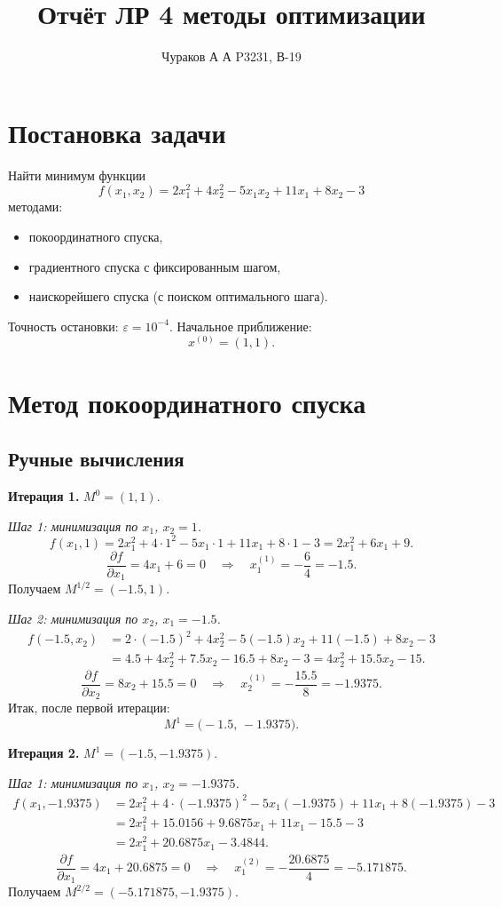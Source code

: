 \documentclass{article}
\begin{document}
\title{Отчёт ЛР 4 методы оптимизации}
\author{Чураков А А P3231, В-19}
\maketitle

\section{Постановка задачи}
Найти минимум функции
\[
f(x_1,x_2)=2x_1^2+4x_2^2-5x_1x_2+11x_1+8x_2-3
\]
методами:
\begin{itemize}
  \item покоординатного спуска,
  \item градиентного спуска с фиксированным шагом,
  \item наискорейшего спуска (с поиском оптимального шага).
\end{itemize}
Точность остановки: $\varepsilon=10^{-4}$. Начальное приближение:
\[
x^{(0)}=(1,1).
\]

\section{Метод покоординатного спуска}
\subsection{Ручные вычисления}

\textbf{Итерация 1.} $M^0=(1,1)$.

\medskip
\emph{Шаг 1: минимизация по $x_1$, $x_2=1$.}
\[
f(x_1,1)=2x_1^2+4\cdot1^2-5x_1\cdot1+11x_1+8\cdot1-3
=2x_1^2+6x_1+9.
\]
\[
\frac{\partial f}{\partial x_1}=4x_1+6=0
\quad\Longrightarrow\quad
x_1^{(1)}=-\frac{6}{4}=-1.5.
\]
Получаем $M^{1/2}=(-1.5,1)$.

\medskip
\emph{Шаг 2: минимизация по $x_2$, $x_1=-1.5$.}
\begin{align*}
f(-1.5,x_2)&=2\cdot(-1.5)^2+4x_2^2-5(-1.5)x_2+11(-1.5)+8x_2-3\\
&=4.5+4x_2^2+7.5x_2-16.5+8x_2-3
=4x_2^2+15.5x_2-15.
\end{align*}
\[
\frac{\partial f}{\partial x_2}=8x_2+15.5=0
\quad\Longrightarrow\quad
x_2^{(1)}=-\frac{15.5}{8}=-1.9375.
\]
Итак, после первой итерации:
\[
M^1=\bigl(-1.5,\,-1.9375\bigr).
\]

\medskip
\textbf{Итерация 2.} $M^1=(-1.5,-1.9375)$.

\medskip
\emph{Шаг 1: минимизация по $x_1$, $x_2=-1.9375$.}
\begin{align*}
f(x_1,-1.9375)&=2x_1^2+4\cdot(-1.9375)^2-5x_1(-1.9375)+11x_1+8(-1.9375)-3\\
&=2x_1^2+15.0156+9.6875x_1+11x_1-15.5-3\\
&=2x_1^2+20.6875x_1-3.4844.
\end{align*}
\[
\frac{\partial f}{\partial x_1}=4x_1+20.6875=0
\quad\Longrightarrow\quad
x_1^{(2)}=-\frac{20.6875}{4}=-5.171875.
\]
Получаем $M^{2/2}=(-5.171875,-1.9375)$.
\end{document}

